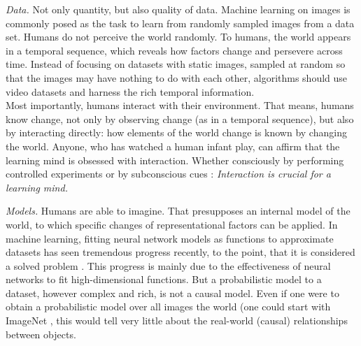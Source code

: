 	\emph{Data.}
		Not only quantity, but also quality of data. Machine learning on images is commonly posed as the task to learn from randomly sampled images from a data set. Humans do not perceive the world randomly.
		To humans, the world appears in a temporal sequence, which reveals how factors change and persevere across time. Instead of focusing on datasets with static images, sampled at random so that the images may have nothing to do with each other, algorithms should use video datasets and harness the rich temporal information.\\
		Most importantly, humans interact with their environment.
		That means, humans know change, not only by observing change (as in a temporal sequence), but also by interacting directly: how elements of the world change is known by changing the world.
		Anyone, who has watched a human infant play, can affirm that the learning mind is obsessed with interaction.
		Whether consciously by performing controlled experiments or by subconscious cues \cite{wall08egomotion}: \textit{Interaction is crucial for a learning mind.}


	\emph{Models.}
		Humans are able to imagine. That presupposes an internal model of the world, to which specific changes of representational factors can be applied.
		In machine learning, fitting neural network models as functions to approximate datasets has seen tremendous progress recently, to the point, that it is considered a solved problem . This progress is mainly due to the effectiveness of neural networks to fit high-dimensional functions. But a probabilistic model to a dataset, however complex and rich, is not a causal model. Even if one were to obtain a probabilistic model over all images the world (one could start with \eg ImageNet \cite{russakovsky15imagenet}, this would tell very little about the real-world (causal) relationships between objects.

